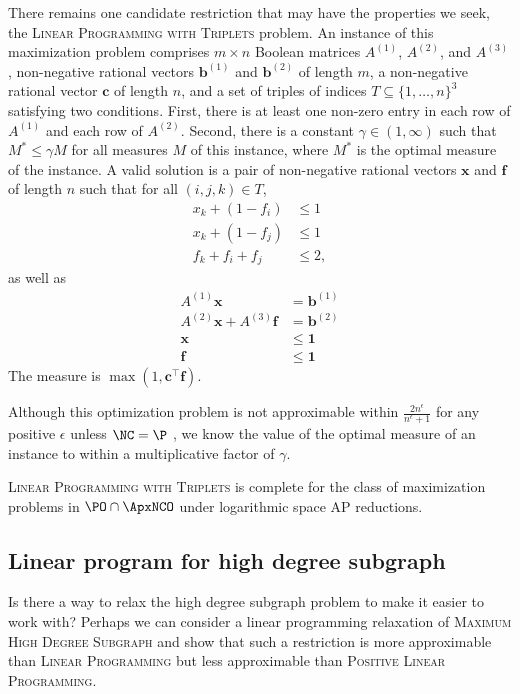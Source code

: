 There remains one candidate restriction that may have the properties we seek, the \textsc{Linear Programming with Triplets} problem.
An instance of this maximization problem comprises $m \times n$ Boolean matrices $A^{(1)}$, $A^{(2)}$, and $A^{(3)}$, non-negative rational vectors $\mathbf{b}^{(1)}$ and $\mathbf{b}^{(2)}$ of length $m$, a non-negative rational vector $\mathbf{c}$ of length $n$, and a set of triples of indices $T \subseteq \{1, \dotsc, n\}^3$ satisfying two conditions.
First, there is at least one non-zero entry in each row of $A^{(1)}$ and each row of $A^{(2)}$.
Second, there is a constant $\gamma \in (1, \infty)$ such that $M^* \leq \gamma M$ for all measures $M$ of this instance, where $M^*$ is the optimal measure of the instance.
A valid solution is a pair of non-negative rational vectors $\mathbf{x}$ and $\mathbf{f}$ of length $n$ such that for all $(i, j, k) \in T$,
\begin{align*}
  x_k + (1 - f_i) & \leq 1 \\
  x_k + (1 - f_j) & \leq 1 \\
  f_k + f_i + f_j & \leq 2,
\end{align*}
as well as
\begin{align*}
  A^{(1)} \mathbf{x} & = \mathbf{b}^{(1)} \\
  A^{(2)} \mathbf{x} + A^{(3)} \mathbf{f} & = \mathbf{b}^{(2)} \\[0.5em]
  \mathbf{x} & \leq \mathbf{1} \\
  \mathbf{f} & \leq \mathbf{1}
\end{align*}
The measure is $\max(1, \mathbf{c}^\intercal \mathbf{f})$.

Although this optimization problem is not approximable within $\frac{2 n^\epsilon}{n^\epsilon + 1}$ for any positive $\epsilon$ unless $\NC = \P$ \cite[Corollary~1]{sx02}, we know the value of the optimal measure of an instance to within a multiplicative factor of $\gamma$.

\begin{conjecture}
  \textsc{Linear Programming with Triplets} is complete for the class of maximization problems in $\PO \cap \ApxNCO$ under logarithmic space AP reductions.
\end{conjecture}

\subsection{Linear program for high degree subgraph}

Is there a way to relax the high degree subgraph problem to make it easier to work with?
Perhaps we can consider a linear programming relaxation of \textsc{Maximum High Degree Subgraph} and show that such a restriction is more approximable than \textsc{Linear Programming} but less approximable than \textsc{Positive Linear Programming}.


